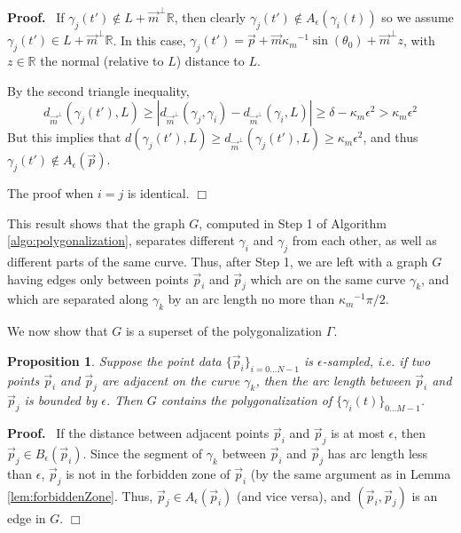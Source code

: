 \documentclass{article}
\newcommand{\nin}{\not\in}
\newtheorem{proposition}[cntr]{Proposition}
\newenvironment{proof}{
  \noindent\textbf{Proof.}\ }{\hspace*{\fill}
  \begin{math}\Box\end{math}\medskip}
\numberwithin{cntr}{section}
\numberwithin{equation}{section}
\newcommand{\abs}[1]{\left| #1 \right|}%
\newcommand{\RR}[0]{{\mathbb{R}}}
\newcommand{\vp}[0]{{\vec{p}}}
\newcommand{\vm}[0]{{\vec{m}}}
\newcommand{\Oto}[1]{{0 \ldots #1-1}}
\newcommand{\OtoN}{{0 \ldots N-1}}
\newcommand{\pointData}{{ \{ \vp_{i} \}_{i=\OtoN} }}
\newcommand{\curveSet}{{ \{ \gamma_i(t) \}_{\Oto{M}}}}
\newcommand{\ball}[2]{ { B_{#1}(#2) } }
\newcommand{\allowed}[2]{ { A_{#1}(#2) } }
\newcommand{\curvemax}{{\kappa_{m}}}
\newcommand{\curvemaxi}{{\curvemax^{-1}}}
\begin{document}
\begin{proof}
If $\gamma_{j}(t') \nin L+\vm^{\perp} \RR$, then clearly $\gamma_{j}(t') \nin \allowed{\epsilon}{\gamma_{i}(t)}$ so we assume $\gamma_{j}(t') \in L+\vm^{\perp} \RR$. In this case, $\gamma_{j}(t') = \vp + \vm \curvemaxi \sin(\theta_{0}) + \vm^\perp z$, with $z \in \RR$ the normal (relative to $L$) distance to $L$.

By the second triangle inequality,
\begin{equation*}
  d_{\vm^{\perp}}(\gamma_{j}(t'), L) \geq \abs{d_{\vm^{\perp}}(\gamma_{j}, \gamma_{i}) -  d_{\vm^{\perp}}(\gamma_{i}, L)}
  \geq \delta - \curvemax \epsilon^{2} > \curvemax \epsilon^{2}
\end{equation*}
But this implies that $d(\gamma_{j}(t'), L) \geq d_{\vm^{\perp}}(\gamma_{j}(t'), L) \geq \curvemax \epsilon^{2}$, and thus $\gamma_{j}(t') \nin \allowed{\epsilon}{\vp}$.

The proof when $i=j$ is identical.
\end{proof}

This result shows that the graph $G$, computed in Step 1 of Algorithm \ref{algo:polygonalization}, separates different $\gamma_{i}$ and $\gamma_{j}$ from each other, as well as different parts of the same curve. Thus, after Step 1, we are left with a graph $G$ having edges only between points $\vp_{i}$ and $\vp_{j}$ which are on the same curve $\gamma_{k}$, and which are separated along $\gamma_{k}$ by an arc length no more than $\curvemaxi \pi/2$.

We now show that $G$ is a superset of the polygonalization $\Gamma$.

\begin{proposition}
  \label{prop:polyIncludesNeighboringPoints}
  Suppose the point data $\pointData$ is $\epsilon$-sampled, i.e. if two points $\vp_{i}$ and $\vp_{j}$ are adjacent on the curve $\gamma_{k}$, then the \emph{arc length} between $\vp_{i}$ and $\vp_{j}$ is bounded by $\epsilon$. Then $G$ contains the polygonalization of $\curveSet$.
\end{proposition}
\begin{proof}
  If the distance between adjacent points $\vp_{i}$ and $\vp_{j}$ is at most $\epsilon$, then $\vp_{j} \in \ball{\epsilon}{\vp_{i}}$. Since the segment of $\gamma_{k}$ between $\vp_{i}$ and $\vp_{j}$ has arc length less than $\epsilon$, $\vp_{j}$ is not in the forbidden zone of $\vp_{i}$ (by the same argument as in Lemma \ref{lem:forbiddenZone}. Thus, $\vp_{j} \in \allowed{\epsilon}{\vp_{i}}$ (and vice versa), and $(\vp_{i},\vp_{j})$ is an edge in $G$.
\end{proof}
\end{document}
